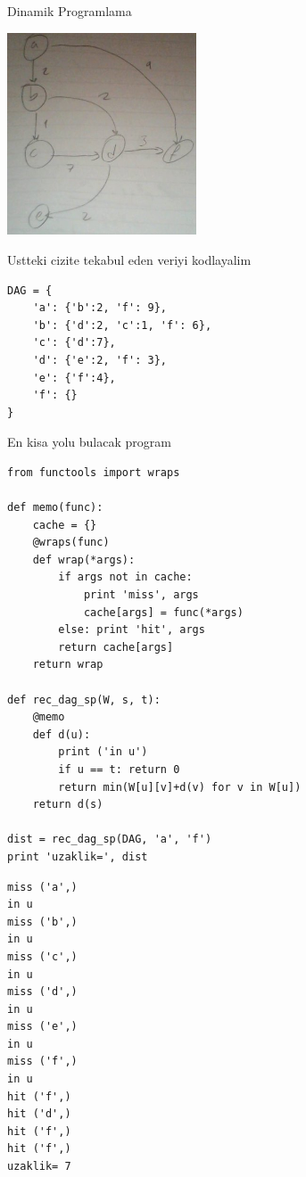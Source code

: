 \documentclass[12pt,fleqn]{article}\usepackage{../common}
\begin{document}
Dinamik Programlama

\includegraphics[height=6cm]{dp1.jpg}

Ustteki cizite tekabul eden veriyi kodlayalim

\begin{verbatim}
DAG = {
    'a': {'b':2, 'f': 9},
    'b': {'d':2, 'c':1, 'f': 6},
    'c': {'d':7},
    'd': {'e':2, 'f': 3},
    'e': {'f':4},
    'f': {}
}
\end{verbatim}

En kisa yolu bulacak program

\begin{verbatim}
from functools import wraps

def memo(func):
    cache = {}                                  
    @wraps(func)                                
    def wrap(*args):                            
        if args not in cache:
            print 'miss', args
            cache[args] = func(*args)
        else: print 'hit', args
        return cache[args]                      
    return wrap 

def rec_dag_sp(W, s, t):                        
    @memo                                       
    def d(u):
        print ('in u')
        if u == t: return 0                     
        return min(W[u][v]+d(v) for v in W[u])  
    return d(s)                                 

dist = rec_dag_sp(DAG, 'a', 'f')
print 'uzaklik=', dist
\end{verbatim}

\begin{verbatim}
miss ('a',)
in u
miss ('b',)
in u
miss ('c',)
in u
miss ('d',)
in u
miss ('e',)
in u
miss ('f',)
in u
hit ('f',)
hit ('d',)
hit ('f',)
hit ('f',)
uzaklik= 7
\end{verbatim}
\end{document}
